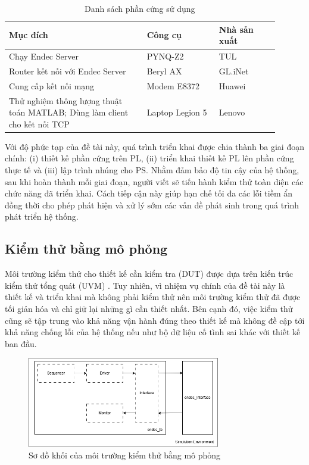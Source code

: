 \documentclass[../DoAn.tex]{subfiles}
\begin{document}
\begin{table}[H]
\centering{}
    \caption{Danh sách phần cứng sử dụng}
    \begin{tabular}{|p{0.46\linewidth}|p{0.24\linewidth}|p{0.2\linewidth}|}
        \hline
        \textbf{Mục đích} & \textbf{Công cụ}  & \textbf{Nhà sản xuất} \\ \hline\hline
        Chạy Endec  Server  & PYNQ-Z2   & TUL           \\ \hline
        Router kết nối với Endec Server  & Beryl AX   & GL.iNet          \\ \hline
        Cung cấp kết nối mạng   & Modem E8372   & Huawei          \\ \hline
        Thử nghiệm thông lượng thuật toán MATLAB; Dùng làm client cho kết nối TCP   & Laptop Legion 5   & Lenovo          \\ \hline
        \end{tabular}
\end{table}

Với độ phức tạp của đề tài này, quá trình triển khai được chia thành ba giai đoạn chính: (i) thiết kế phần cứng trên PL, (ii) triển khai thiết kế PL lên phần cứng thực tế và (iii) lập trình nhúng cho PS. Nhằm đảm bảo độ tin cậy của hệ thống, sau khi hoàn thành mỗi giai đoạn, người viết sẽ tiến hành kiểm thử toàn diện các chức năng đã triển khai. Cách tiếp cận này giúp hạn chế tối đa các lỗi tiềm ẩn đồng thời cho phép phát hiện và xử lý sớm các vấn đề phát sinh trong quá trình phát triển hệ thống.

\subsection{Kiểm thử bằng mô phỏng}

Môi trường kiểm thử cho thiết kế cần kiểm tra (DUT) được dựa trên kiến trúc kiểm thử tổng quát (UVM) \cite{admin_uvm_nodate}. Tuy nhiên, vì nhiệm vụ chính của đề tài này là thiết kế và triển khai mà không phải kiểm thử nên môi trường kiểm thử đã được tối giản hóa và chỉ giữ lại những gì cần thiết nhất. Bên cạnh đó, việc kiểm thử cũng sẽ tập trung vào khả năng vận hành đúng theo thiết kế mà không đề cập tới khả năng chống lỗi của hệ thống nếu như bộ dữ liệu cố tình sai khác với thiết kế ban đầu.

\begin{figure}[H]
    \centering
    \includegraphics[width=0.75\textwidth, height=0.2\textheight, keepaspectratio]{Hinhve/Chuong 4/simulation block.png}
    \caption{Sơ đồ khối của môi trường kiểm thử bằng mô phỏng}
    \label{fig:Sơ đồ khối của môi trường kiểm thử}
\end{figure}
\end{document}
